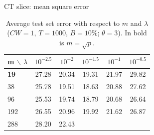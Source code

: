 \documentclass{article}
\begin{document}
\begin{table}[t]
\caption{Average test set error with respect to $m$ and $\lambda$ ($CW=1$, 
$T=1000$, $B=10\%$; $\theta=3$). 
In bold is $m=\sqrt{p}$.}
\label{tab:maxFeat}
\begin{center}
\begin{footnotesize}
CT slice: mean square error
\begin{tabular}{l|ccccc}
\hline
m $\backslash$ $\lambda$  &  $10^{-2.5}$ & $10^{-2}$ & $10^{-1.5}$ & 
$10^{-1}$ & $10^{-0.5}$ \\
\hline
{\bf 19} & \cellcolor[gray]{0.59} 27.28 & \cellcolor[gray]{0.92} 20.34 & 
\cellcolor[gray]{0.97} 19.31 & \cellcolor[gray]{0.84} 21.97 & 
\cellcolor[gray]{0.47} 29.82 \\
38 & \cellcolor[gray]{0.66} 25.78 & \cellcolor[gray]{0.96} 19.51 & 
\cellcolor[gray]{1.00} 18.63 & \cellcolor[gray]{0.89} 20.88 & 
\cellcolor[gray]{0.58} 27.62 \\
96 & \cellcolor[gray]{0.68} 25.53 & \cellcolor[gray]{0.95} 19.74 & 
\cellcolor[gray]{0.99} 18.79 & \cellcolor[gray]{0.90} 20.68 & 
\cellcolor[gray]{0.62} 26.64 \\
192 & \cellcolor[gray]{0.63} 26.55 & \cellcolor[gray]{0.89} 20.96 & 
\cellcolor[gray]{0.94} 19.92 & \cellcolor[gray]{0.86} 21.62 & 
\cellcolor[gray]{0.61} 26.87 \\
288 & \cellcolor[gray]{0.55} 28.20 & \cellcolor[gray]{0.82} 22.43 & 

\end{tabular}
\end{footnotesize}
\end{center}
\end{table}
\end{document}
